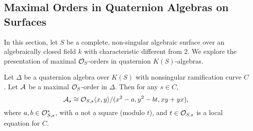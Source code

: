 \subsection{Maximal Orders in Quaternion Algebras on Surfaces}
In this section, let $S$ be a complete, non-singular algebraic surface over an algebraically closed field $k$ with characteristic different from $2$.  We explore the presentation of maximal $\mathcal{O}_S$-orders in quaternion $K(S)$-algebras.
\begin{prop}
Let $\Delta$ be a quaternion algebra over $K(S)$ with nonsingular ramification curve $C$.  Let $\mathcal{A}$ be a maximal $\mathcal{O}_S$-order in $\Delta$.  Then for any $s\in C$,
$$\mathcal{A}_s \cong \mathcal{O}_{S,s}\langle x,y\rangle/(x^2-a,y^2-bt,xy+yx),$$
where $a,b\in\mathcal{O}_{S,s}^*$, with $a$ not a square (modulo $t$), and $t\in \mathcal{O}_{S,s}$ is a local equation for $C$.
\end{prop}
